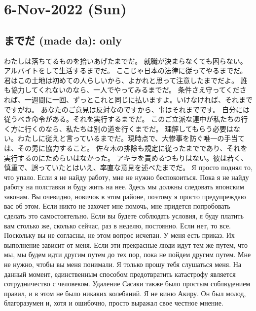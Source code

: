 \section{6-Nov-2022 (Sun) }
\subsection{までだ (made da): only}

わたしは落ちてるものを拾いあげたまでだ。
就職が決まらなくても困らない。アルバイトをして生活するまでだ。
ここじゃ日本の法律に従ってやるまでだ。
君はこの土地は初めての人らしいから、よかれと思って注意したまでだよ。
誰も協力してくれないのなら、一人でやってみるまでだ。
条件さえ守ってくだされば、一週間に一回、ずっとこれと同じに払いますよ。いけなければ、それまでですがね。
あなたのご意見は反対なのですから、事はそれまでです。
自分には従うべき命令がある。それを実行するまでだ。
このご立派な連中が私たちの行く方に行くのなら、私たちは別の道を行くまでだ。
理解してもらう必要はない。わたしに従えと言っているまでだ。現時点で、大惨事を防ぐ唯一の手当ては、その男に協力すること。
佐々木の排除も規定に従ったまでであり、それを実行するのにためらいはなかった。
アキラを責めるつもりはない。彼は若く、慎重で、誤っていたとはいえ、率直な意見を述べたまでだ。
Я просто поднял то, что упало.
Если я не найду работу, мне не нужно беспокоиться. Пока я не найду работу на полставки и буду жить на нее.
Здесь мы должны следовать японским законам.
Вы очевидно, новичок в этом районе, поэтому я просто предупреждаю вас об этом.
Если никто не захочет мне помочь, мне придется попробовать сделать это самостоятельно.
Если вы будете соблюдать условия, я буду платить вам столько же, сколько сейчас, раз в неделю, постоянно. Если нет, то все.
Поскольку вы не согласны, не этом вопрос исчепан.
У меня есть приказ. Их выполнение зависит от меня.
Если эти прекрасные люди идут тем же путем, что мы, мы будем идти другим путем до тех пор, пока не пойдем другим путем.
Мне не нужно, чтобы вы меня понимали. Я только прошу тебя слушаться меня. На данный момент, единственным способом предотвратить катастрофу является сотрудничество с человеком.
Удаление Сасаки также было простым соблюдением правил, и в этом не было никаких колебаний.
Я не виню Акиру. Он был молод, благоразумен и, хотя и ошибочно, просто выражал свое честное мнение.

